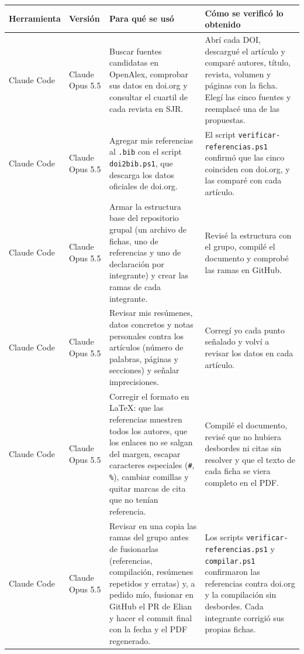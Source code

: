 \begin{tabularx}{\textwidth}{@{}ll>{\raggedright\arraybackslash}X>{\raggedright\arraybackslash}X@{}}
  \toprule
  \textbf{Herramienta} & \textbf{Versión} & \textbf{Para qué se usó} & \textbf{Cómo se verificó lo obtenido} \\
  \midrule
  Claude Code & Claude Opus 5.5 & Buscar fuentes candidatas en OpenAlex, comprobar sus datos en doi.org y consultar el cuartil de cada revista en SJR. & Abrí cada DOI, descargué el artículo y comparé autores, título, revista, volumen y páginas con la ficha. Elegí las cinco fuentes y reemplacé una de las propuestas. \\
  \addlinespace
  Claude Code & Claude Opus 5.5 & Agregar mis referencias al \texttt{.bib} con el script \texttt{doi2bib.ps1}, que descarga los datos oficiales de doi.org. & El script \texttt{verificar-\allowbreak referencias.ps1} confirmó que las cinco coinciden con doi.org, y las comparé con cada artículo. \\
  \addlinespace
  Claude Code & Claude Opus 5.5 & Armar la estructura base del repositorio grupal (un archivo de fichas, uno de referencias y uno de declaración por integrante) y crear las ramas de cada integrante. & Revisé la estructura con el grupo, compilé el documento y comprobé las ramas en GitHub. \\
  \addlinespace
  Claude Code & Claude Opus 5.5 & Revisar mis resúmenes, datos concretos y notas personales contra los artículos (número de palabras, páginas y secciones) y señalar imprecisiones. & Corregí yo cada punto señalado y volví a revisar los datos en cada artículo. \\
  \addlinespace
  Claude Code & Claude Opus 5.5 & Corregir el formato en LaTeX: que las referencias muestren todos los autores, que los enlaces no se salgan del margen, escapar caracteres especiales (\texttt{\#}, \texttt{\%}), cambiar comillas y quitar marcas de cita que no tenían referencia. & Compilé el documento, revisé que no hubiera desbordes ni citas sin resolver y que el texto de cada ficha se viera completo en el PDF. \\
  \addlinespace
  Claude Code & Claude Opus 5.5 & Revisar en una copia las ramas del grupo antes de fusionarlas (referencias, compilación, resúmenes repetidos y erratas) y, a pedido mío, fusionar en GitHub el PR de Elian y hacer el commit final con la fecha y el PDF regenerado. & Los scripts \texttt{verificar-\allowbreak referencias.ps1} y \texttt{compilar.ps1} confirmaron las referencias contra doi.org y la compilación sin desbordes. Cada integrante corrigió sus propias fichas. \\
  \bottomrule
\end{tabularx}
